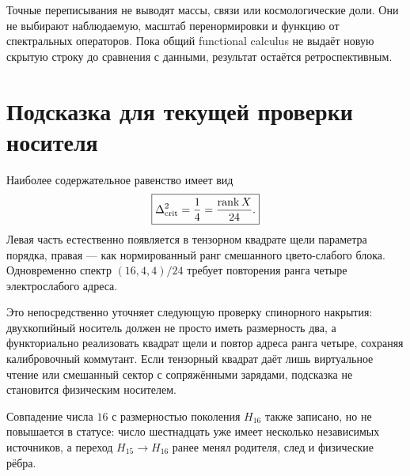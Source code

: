 \begin{nogocriterion}
Точные переписывания не выводят массы, связи или космологические доли.
Они не выбирают наблюдаемую, масштаб перенормировки и функцию от
спектральных операторов. Пока общий functional calculus не выдаёт новую
скрытую строку до сравнения с данными, результат остаётся
ретроспективным.
\end{nogocriterion}

\section{Подсказка для текущей проверки носителя}

Наиболее содержательное равенство имеет вид
\begin{equation}
 \boxed{
 \Delta_{\rm crit}^2=\frac14=\frac{\operatorname{rank} X}{24}.}
 \label{eq:v6-atlas-two-copy-clue}
\end{equation}
Левая часть естественно появляется в тензорном квадрате щели параметра
порядка, правая --- как нормированный ранг смешанного цвето-слабого блока.
Одновременно спектр $(16,4,4)/24$ требует повторения ранга четыре
электрослабого адреса.

Это непосредственно уточняет следующую проверку спинорного накрытия: двухкопийный
носитель должен не просто иметь размерность два, а функториально
реализовать квадрат щели и повтор адреса ранга четыре, сохраняя калибровочный
коммутант. Если тензорный квадрат даёт лишь виртуальное чтение или смешанный
сектор с сопряжёнными зарядами, подсказка не становится физическим
носителем.

Совпадение числа $16$ с размерностью поколения $H_{16}$ также записано,
но не повышается в статусе: число шестнадцать уже имеет несколько
независимых источников, а переход $H_{15}\to H_{16}$ ранее менял родителя,
след и физические рёбра.

